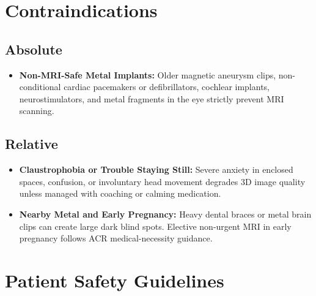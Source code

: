 \section{Contraindications}

\subsection{Absolute}

\begin{itemize}
    \item \textbf{Non-MRI-Safe Metal Implants:} Older magnetic aneurysm clips, non-conditional cardiac pacemakers or defibrillators, cochlear implants, neurostimulators, and metal fragments in the eye strictly prevent MRI scanning.
\end{itemize}

\subsection{Relative}

\begin{itemize}
    \item \textbf{Claustrophobia or Trouble Staying Still:} Severe anxiety in enclosed spaces, confusion, or involuntary head movement degrades 3D image quality unless managed with coaching or calming medication.
    \item \textbf{Nearby Metal and Early Pregnancy:} Heavy dental braces or metal brain clips can create large dark blind spots. Elective non-urgent MRI in early pregnancy follows ACR medical-necessity guidance.
\end{itemize}

\section{Patient Safety Guidelines}

